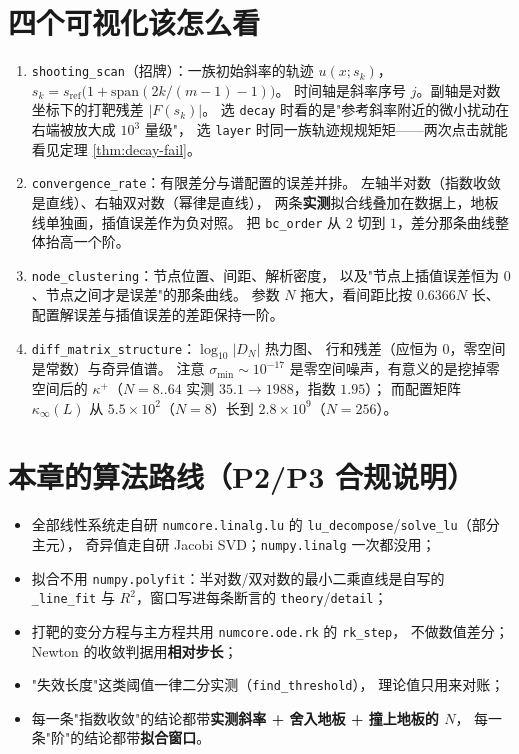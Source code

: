 \section{四个可视化该怎么看}

\begin{enumerate}
  \item \texttt{shooting\_\allowbreak{}scan}（招牌）：一族初始斜率的轨迹
        $u(x;s_k)$，$s_k=s_{\text{ref}}\bigl(1+\text{span}(2k/(m-1)-1)\bigr)$。
        时间轴是斜率序号 $j$。副轴是对数坐标下的打靶残差 $|F(s_k)|$。
        选 \texttt{decay} 时看的是"参考斜率附近的微小扰动在右端被放大成 $10^3$ 量级"，
        选 \texttt{layer} 时同一族轨迹规规矩矩——两次点击就能看见定理 \ref{thm:decay-fail}。
  \item \texttt{convergence\_\allowbreak{}rate}：有限差分与谱配置的误差并排。
        左轴半对数（指数收敛是直线）、右轴双对数（幂律是直线），
        两条\textbf{实测}拟合线叠加在数据上，地板线单独画，插值误差作为负对照。
        把 \texttt{bc\_\allowbreak{}order} 从 $2$ 切到 $1$，差分那条曲线整体抬高一个阶。
  \item \texttt{node\_\allowbreak{}clustering}：节点位置、间距、解析密度，
        以及"节点上插值误差恒为 $0$、节点之间才是误差"的那条曲线。
        参数 $N$ 拖大，看间距比按 $0.6366N$ 长、配置解误差与插值误差的差距保持一阶。
  \item \texttt{diff\_\allowbreak{}matrix\_\allowbreak{}structure}：$\log_{10}|D_N|$ 热力图、
        行和残差（应恒为 $0$，零空间是常数）与奇异值谱。
        注意 $\sigma_{\min}\sim10^{-17}$ 是零空间噪声，有意义的是挖掉零空间后的
        $\kappa^+$（$N=8..64$ 实测 $35.1\to1988$，指数 $1.95$）；
        而配置矩阵 $\kappa_\infty(L)$ 从 $5.5\times10^{2}$（$N=8$）长到 $2.8\times10^{9}$（$N=256$）。
\end{enumerate}

\section{本章的算法路线（P2/P3 合规说明）}

\begin{itemize}
  \item 全部线性系统走自研 \texttt{numcore.linalg.lu} 的
        \texttt{lu\_decompose}/\texttt{solve\_lu}（部分主元），
        奇异值走自研 Jacobi SVD；\texttt{numpy.linalg} 一次都没用；
  \item 拟合不用 \texttt{numpy.polyfit}：半对数/双对数的最小二乘直线是自写的
        \texttt{\_line\_fit} 与 $R^2$，窗口写进每条断言的 \texttt{theory}/\texttt{detail}；
  \item 打靶的变分方程与主方程共用 \texttt{numcore.ode.rk} 的 \texttt{rk\_step}，
        不做数值差分；Newton 的收敛判据用\textbf{相对步长}；
  \item "失效长度"这类阈值一律二分实测（\texttt{find\_threshold}），
        理论值只用来对账；
  \item 每一条"指数收敛"的结论都带\textbf{实测斜率 + 舍入地板 + 撞上地板的 $N$}，
        每一条"阶"的结论都带\textbf{拟合窗口}。
\end{itemize}


